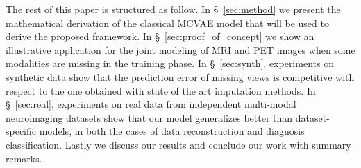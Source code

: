 The rest of this paper is structured as follow.
In \S~\ref{sec:method} we present the mathematical derivation of the classical MCVAE model that will be used to derive the proposed framework.
In \S~\ref{sec:proof_of_concept} we show an illustrative application for the joint modeling of MRI and PET images when some modalities are missing in the training phase.
In \S~\ref{sec:synth}, experiments on synthetic data show that the prediction error of missing views is competitive with respect to the one obtained with state of the art imputation methods.
In \S~\ref{sec:real}, experiments on real data from independent multi-modal neuroimaging datasets show that our model generalizes better than dataset-specific models, in both the cases of data reconstruction and diagnosis classification.
Lastly we discuss our results and conclude our work with summary remarks.

% 
%
%
%
